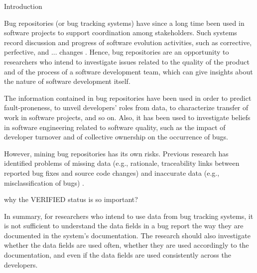 
\begin{section}{Introduction}

Bug repositories (or bug tracking systems) have since a long time been used in software projects to support coordination among stakeholders. Such systems record discussion and progress of software evolution activities, such as corrective, perfective, and ... changes \cite{Antoniol2008}. Hence, bug repositories are an opportunity to researchers who intend to investigate issues related to the quality of the product and of the process of a software development team, which can give insights about the nature of software development itself.

The information contained in bug repositories have been used in order to predict fault-proneness, to unveil developers' roles from data, to characterize transfer of work in software projects, and so on. Also, it has been used to investigate beliefs in software engineering related to software quality, such as the impact of developer turnover and of collective ownership on the occurrence of bugs.

However, mining bug repositories has its own risks. Previous research has identified problems of missing data (e.g., rationale, traceability links between reported bug fixes and source code changes) and inaccurate data (e.g., misclassification of bugs) \cite{Aranda2009,Bird2009,Nguyen2010,Ayari2007}.

\TODO why the VERIFIED status is so important?

In summary, for researchers who intend to use data from bug tracking systems, it is not sufficient to understand the data fields in a bug report the way they are documented in the system's documentation. The research should also investigate whether the data fields are used often, whether they are used accordingly to the documentation, and even if the data fields are used consistently across the developers.


\end{section}
